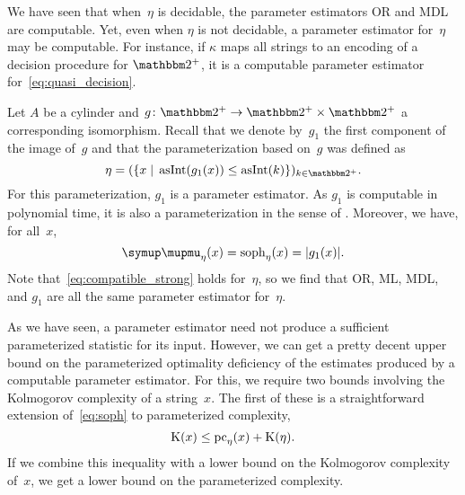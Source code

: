 We have seen that when~$\eta$ is decidable, the parameter estimators OR and MDL are computable.
Yet, even when $\eta$ is not decidable, a parameter estimator for~$\eta$ may be computable.
For instance, if $\kappa$ maps all strings to an encoding of a decision procedure for $\binary^+$, it is a computable parameter estimator for~\eqref{eq:quasi_decision}.

\begin{example}
\label{ex:p-cylinder:estimator}%
  Let $A$ be a \pdash{}cylinder and $g\colon \binary^+ \to \binary^+ \times \binary^+$ a corresponding isomorphism.
  Recall that we denote by~$g_1$ the first component of the image of~$g$ and that the parameterization based on~$g$ was defined as
  \begin{equation*}
    \eta \deq (\{x \st \asNat(g_1(x)) \le \asNat(k)\})_{k \in \binary^+}.
  \end{equation*}
  For this parameterization, $g_1$ is a parameter estimator.
  As $g_1$ is computable in polynomial time, it is also a parameterization in the sense of \citeauthor{flum2006parameterized}.
  Moreover, we have, for all~$x$,
  \begin{equation*}
    \mu_\eta(x) = \soph_\eta(x) = \length{g_1(x)}.
  \end{equation*}
  Note that~\eqref{eq:compatible_strong} holds for~$\eta$, so we find that OR, ML, MDL, and $g_1$ are all the same parameter estimator for~$\eta$.
\end{example}

As we have seen, a parameter estimator need not produce a sufficient parameterized statistic for its input.
However, we can get a pretty decent upper bound on the parameterized optimality deficiency of the estimates produced by a computable parameter estimator.
For this, we require two bounds involving the Kolmogorov complexity of a string~$x$.
The first of these is a straightforward extension of~\eqref{eq:soph} to parameterized complexity,
\begin{equation}
\label{eq:kclepc}
  \operatorname{K}(x) \le \operatorname{pc}_\eta(x) + \operatorname{K}(\eta).
\end{equation}
If we combine this inequality with a lower bound on the Kolmogorov complexity of~$x$, we get a lower bound on the parameterized complexity.

